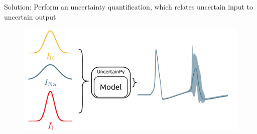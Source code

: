 \documentclass[presentation]{beamer}
\begin{document}
\begin{frame}{Solution: Perform an uncertainty quantification, which relates uncertain input to uncertain output}
    \begin{figure}
       {\includegraphics[width=1.1\textwidth]{probabalistic.png}}

    \end{figure}
\end{frame}


\end{document}
